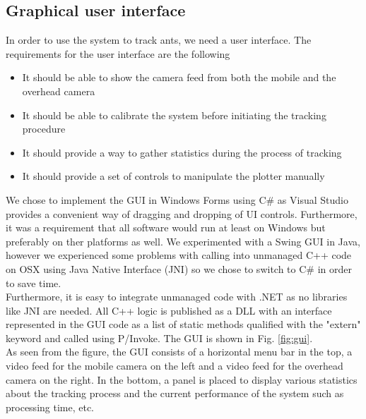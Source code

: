 
\subsection{Graphical user interface}


In order to use the system to track ants, we need a user interface. The requirements for the user interface are the following

\begin{itemize}
  \item{It should be able to show the camera feed from both the mobile and the overhead camera}
  \item{It should be able to calibrate the system before initiating the tracking procedure}
  \item{It should provide a way to gather statistics during the process of tracking}
  \item{It should provide a set of controls to manipulate the plotter manually}
\end{itemize}

We chose to implement the GUI in Windows Forms using C\# as Visual Studio provides a convenient way of dragging and dropping of UI controls. Furthermore, it was a requirement that all software would run at least on Windows but preferably on ther platforms as well. We experimented with a Swing GUI in Java, however we experienced some problems with calling into unmanaged C++ code on OSX using Java Native Interface (JNI) so we chose to switch to C\# in order to save time. \\

Furthermore, it is easy to integrate unmanaged code with .NET as no libraries like JNI are needed. All C++ logic is published as a DLL with an interface represented in the GUI code as a list of static methods qualified with the "extern" keyword and called using P/Invoke. The GUI is shown in Fig. \ref{fig:gui}. \\

As seen from the figure, the GUI consists of a horizontal menu bar in the top, a video feed for the mobile camera on the left and a video feed for the overhead camera on the right. In the bottom, a panel is placed to display various statistics about the tracking process and the current performance of the system such as processing time, etc. \\

